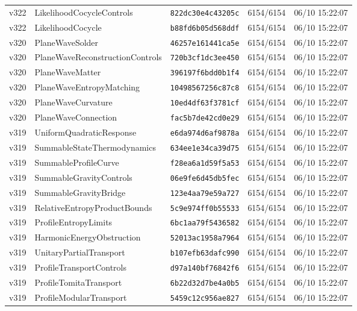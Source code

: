 \documentclass[11pt]{article}
\theoremstyle{definition}\newtheorem{deriv}{Derivação}
\begin{document}
{\begin{longtable}{@{}lllll@{}}
v322 & LikelihoodCocycleControls & \texttt{822dc30e4c43205c} & 6154/6154 & 06/10 15:22:07 \\
v322 & LikelihoodCocycle & \texttt{b88fd6b05d568ddf} & 6154/6154 & 06/10 15:22:07 \\
v320 & PlaneWaveSolder & \texttt{46257e161441ca5e} & 6154/6154 & 06/10 15:22:07 \\
v320 & PlaneWaveReconstructionControls & \texttt{720b3cf1dc3ee450} & 6154/6154 & 06/10 15:22:07 \\
v320 & PlaneWaveMatter & \texttt{396197f6bdd0b1f4} & 6154/6154 & 06/10 15:22:07 \\
v320 & PlaneWaveEntropyMatching & \texttt{10498567256c87c8} & 6154/6154 & 06/10 15:22:07 \\
v320 & PlaneWaveCurvature & \texttt{10ed4df63f3781cf} & 6154/6154 & 06/10 15:22:07 \\
v320 & PlaneWaveConnection & \texttt{fac5b7de42cd0e29} & 6154/6154 & 06/10 15:22:07 \\
v319 & UniformQuadraticResponse & \texttt{e6da974d6af9878a} & 6154/6154 & 06/10 15:22:07 \\
v319 & SummableStateThermodynamics & \texttt{634ee1e34ca39d75} & 6154/6154 & 06/10 15:22:07 \\
v319 & SummableProfileCurve & \texttt{f28ea6a1d59f5a53} & 6154/6154 & 06/10 15:22:07 \\
v319 & SummableGravityControls & \texttt{06e9fe6d45db5fec} & 6154/6154 & 06/10 15:22:07 \\
v319 & SummableGravityBridge & \texttt{123e4aa79e59a727} & 6154/6154 & 06/10 15:22:07 \\
v319 & RelativeEntropyProductBounds & \texttt{5c9e974ff0b55533} & 6154/6154 & 06/10 15:22:07 \\
v319 & ProfileEntropyLimits & \texttt{6bc1aa79f5436582} & 6154/6154 & 06/10 15:22:07 \\
v319 & HarmonicEnergyObstruction & \texttt{52013ac1958a7964} & 6154/6154 & 06/10 15:22:07 \\
v319 & UnitaryPartialTransport & \texttt{b107efb63dafc990} & 6154/6154 & 06/10 15:22:07 \\
v319 & ProfileTransportControls & \texttt{d97a140bf76842f6} & 6154/6154 & 06/10 15:22:07 \\
v319 & ProfileTomitaTransport & \texttt{6b22d32d7be4a0b5} & 6154/6154 & 06/10 15:22:07 \\
v319 & ProfileModularTransport & \texttt{5459c12c956ae827} & 6154/6154 & 06/10 15:22:07 \\

\end{longtable}}
\end{document}
